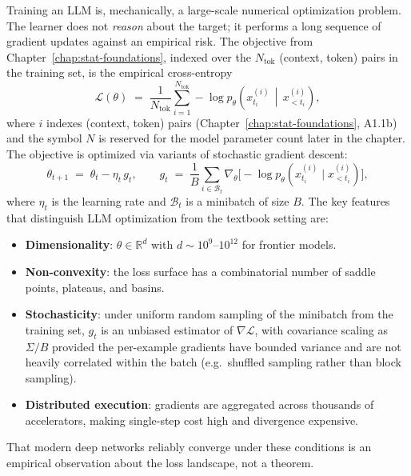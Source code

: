 Training an LLM is, mechanically, a large-scale numerical optimization
problem. The learner does not \emph{reason} about the target; it performs a
long sequence of gradient updates against an empirical risk. The objective
from Chapter~\ref{chap:stat-foundations}, indexed over the $N_{\mathrm{tok}}$ (context, token) pairs in
the training set, is the empirical cross-entropy
\begin{equation}
\label{eq:ch2-empirical-loss}
\mathcal{L}(\theta)
  \;=\; \frac{1}{N_{\mathrm{tok}}} \sum_{i=1}^{N_{\mathrm{tok}}}
        -\log p_{\theta}\!\left( x^{(i)}_{t_i} \,\middle|\, x^{(i)}_{<t_i} \right),
\end{equation}
where $i$ indexes (context, token) pairs (Chapter~\ref{chap:stat-foundations}, A1.1b) and the
symbol $N$ is reserved for the model parameter count later in the
chapter. The objective is optimized via variants of stochastic
gradient descent:
\begin{equation}
\label{eq:ch2-sgd}
\theta_{t+1} \;=\; \theta_t - \eta_t\, g_t,
\qquad
g_t \;=\; \frac{1}{B}\sum_{i \in \mathcal{B}_t}
          \nabla_\theta \bigl[-\log p_{\theta}(x^{(i)}_{t_i} \mid x^{(i)}_{<t_i})\bigr],
\end{equation}
where $\eta_t$ is the learning rate and $\mathcal{B}_t$ is a minibatch of
size $B$. The key features that distinguish LLM optimization from the
textbook setting are:
\begin{itemize}
  \item \textbf{Dimensionality}: $\theta \in \mathbb{R}^d$ with
        $d \sim 10^{9}$--$10^{12}$ for frontier models.
  \item \textbf{Non-convexity}: the loss surface has a combinatorial
        number of saddle points, plateaus, and basins.
  \item \textbf{Stochasticity}: under uniform random sampling of the
        minibatch from the training set, $g_t$ is an unbiased estimator
        of $\nabla \mathcal{L}$, with covariance scaling as $\Sigma/B$
        provided the per-example gradients have bounded variance and
        are not heavily correlated within the batch (e.g.\ shuffled
        sampling rather than block sampling).
  \item \textbf{Distributed execution}: gradients are aggregated across
        thousands of accelerators, making single-step cost high and
        divergence expensive.
\end{itemize}
That modern deep networks reliably converge under these conditions is an
empirical observation about the loss landscape, not a theorem.

